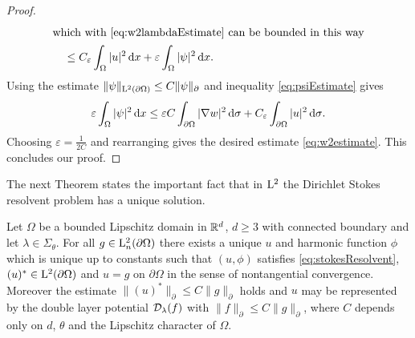 \begin{proof}
\begin{align*}
    \intertext{which with \eqref{eq:w2lambdaEstimate} can be bounded in this way}
    &\quad \leq  C_\varepsilon \int_\Omega |u|^2 \, {\operatorname{d}\!{x}} + \varepsilon \int_\Omega |\psi|^2 \, {\operatorname{d}\!{x}}.
  \end{align*}
  Using the estimate $\|\psi\|_{\mathrm{L}^2(\partial\Omega)} \leq C \|\psi\|_\partial$ and inequality \eqref{eq:psiEstimate} gives
  \begin{align*}
    \varepsilon \int_\Omega |\psi|^2 \, {\operatorname{d}\!{x}} \leq \varepsilon C \int_{\partial\Omega} |\nabla w|^2 \, {\operatorname{d}\!{\sigma}} + C_\varepsilon \int_{\partial\Omega} |u|^2 \, {\operatorname{d}\!{\sigma}}.
  \end{align*}
  Choosing $\varepsilon = \frac{1}{2 C}$ and rearranging gives the desired estimate 
  \eqref{eq:w2estimate}.
  This concludes our proof.
\end{proof}

The next Theorem states the important fact that in $\mathrm{L}^2$ the Dirichlet Stokes resolvent problem has a unique solution.

\begin{thm}
  \label{thm:exAndUniqueSolution}
  Let $\Omega$ be a bounded Lipschitz domain in $\mathbb{R}^d$, $d \geq 3$ with connected boundary and let $\lambda \in \Sigma_\theta$.
  For all $g \in \mathrm{L}^2_n(\partial\Omega)$ there exists a unique $u$ and harmonic function $\phi$ which is unique up to constants such that $(u,\phi)$ satisfies \eqref{eq:stokesResolvent}, $(u)^* \in \mathrm{L}^2(\partial\Omega)$ and $u = g$ on $\partial\Omega$ in the sense of nontangential convergence.
  Moreover the estimate $ \| (u)^* \|_\partial \leq C \| g\|_\partial$ holds and $u$ may be represented by the double layer potential $\mathcal{D}_\lambda(f)$ with $\|f\|_\partial \leq C \|g\|_\partial$, where $C$ depends only on $d$, $\theta$ and the Lipschitz character of $\Omega$.
\end{thm}

